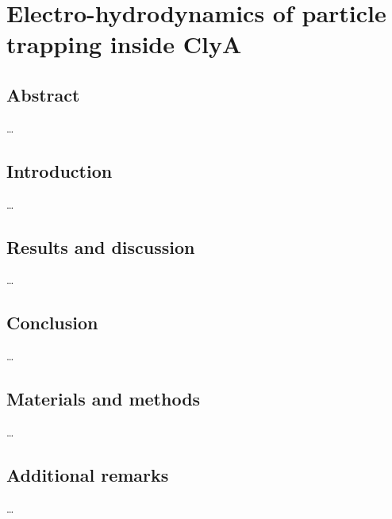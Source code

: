 \chapter{Electro-hydrodynamics of particle trapping inside ClyA}

\section{Abstract}
\ldots
\section{Introduction}
\ldots
\section{Results and discussion}
\ldots
\section{Conclusion}
\ldots
\section{Materials and methods}
\ldots
\section{Additional remarks}
\ldots






